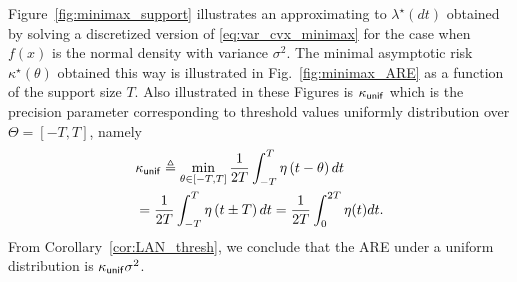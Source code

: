 Figure~\ref{fig:minimax_support} illustrates an approximating to $\lambda^\star(dt)$ obtained by solving a discretized version of \eqref{eq:var_cvx_minimax} for the case when $f(x)$ is the normal density with variance $\sigma^2$. The minimal asymptotic risk $\kappa^\star(\theta)$ obtained this way is illustrated in Fig.~\ref{fig:minimax_ARE} as a function of the support size $T$. Also illustrated in these Figures is $\kappa_{\mathsf{unif}}$ which is the precision parameter corresponding to threshold values uniformly distribution over $\Theta = [-T,T]$, namely
\begin{align}
& \kappa_{\mathsf{unif}} \triangleq \min_{\theta \in [-T,T]} \frac{1}{2T}\int_{-T}^T \eta\left(t-\theta\right) dt \nonumber
 \\
& = 
\frac{1}{2T}\int_{-T}^{T} \eta\left(t\pm T\right) dt
= \frac{1}{2T}\int_{0}^{2T} \eta(t) dt  \label{eq:uniform_risk}. 
\end{align}
From Corollary~\ref{cor:LAN_thresh}, we conclude that the ARE under a uniform distribution is $\kappa_{\mathsf{unif}} \sigma^2$. \par

